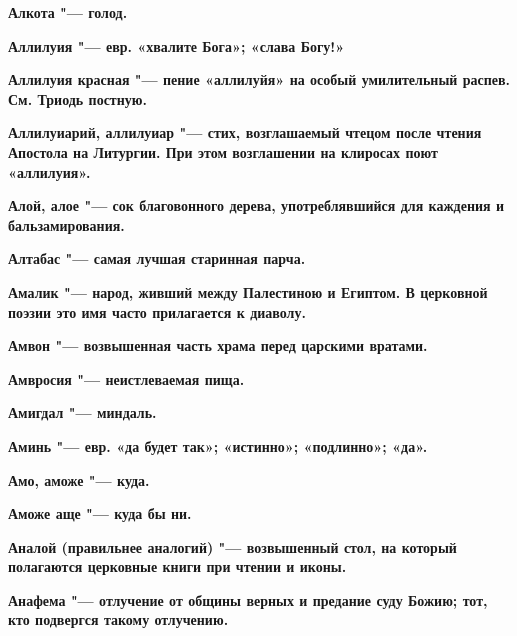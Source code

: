 \begin{mymulticols}{2}
\bfseries Алкота\normalfont{} "--- голод. 




\bfseries Аллилуия\normalfont{} "--- евр. «хвалите Бога»; «слава Богу!» 




\bfseries Аллилуия красная\normalfont{} "--- пение «аллилуйя» на особый умилительный распев. См. Триодь постную. 




\bfseries Аллилуиарий, аллилуиар\normalfont{} "--- стих, возглашаемый чтецом после чтения Апостола на Литургии. При этом возглашении на клиросах поют «аллилуия». 




\bfseries Алой, алое\normalfont{} "--- сок благовонного дерева, употреблявшийся для каждения и бальзамирования. 




\bfseries Алтабас\normalfont{} "--- самая лучшая старинная парча. 




\bfseries Амалик\normalfont{} "--- народ, живший между Палестиною и Египтом. В церковной поэзии это имя часто прилагается к диаволу. 




\bfseries Амвон\normalfont{} "--- возвышенная часть храма перед царскими вратами. 




\bfseries Амвросия\normalfont{} "--- неистлеваемая пища. 




\bfseries Амигдал\normalfont{} "--- миндаль. 




\bfseries Аминь\normalfont{} "--- евр. «да будет так»; «истинно»; «подлинно»; «да». 




\bfseries Амо, аможе\normalfont{} "--- куда. 




\bfseries Аможе аще\normalfont{} "--- куда бы ни. 




\bfseries Аналой\normalfont{} (правильнее \bfseries аналогий\normalfont{}) "--- возвышенный стол, на который полагаются церковные книги при чтении и иконы. 




\bfseries Анафема\normalfont{} "--- отлучение от общины верных и предание суду Божию; тот, кто подвергся такому отлучению. 





\end{mymulticols}
